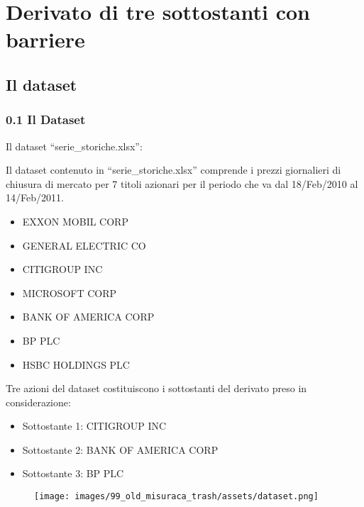 
\section[Derivato 1]{Derivato di tre sottostanti con barriere}


\subsection[Il dataset]{Il dataset}
\begin{frame}
	
	\frametitle{0.1 Il Dataset}
	
	\begin{block}{Il dataset ``serie\_storiche.xlsx'':}

		Il dataset contenuto in ``serie\_storiche.xlsx'' comprende i prezzi giornalieri di chiusura di mercato per 7 titoli azionari per il periodo che va dal 18/Feb/2010 al 14/Feb/2011.\\
		
		\begin{itemize}
			\item EXXON MOBIL CORP
			\item GENERAL ELECTRIC CO
			\item CITIGROUP INC
			\item MICROSOFT CORP
			\item BANK OF AMERICA CORP
			\item BP PLC	
			\item HSBC HOLDINGS PLC
		\end{itemize}

		
	\end{block}

\end{frame}


\begin{frame}
	
	\begin{block}{Tre azioni del dataset costituiscono i sottostanti del derivato preso in considerazione:}
		\begin{itemize}
			\item Sottostante 1: CITIGROUP INC
			\item Sottostante 2: BANK OF AMERICA CORP
			\item Sottostante 3: BP PLC
		\end{itemize}

	\end{block}
	
	\begin{figure}[!htbp]
		\centering
		\texttt{[image: images/99\_old\_misuraca\_trash/assets/dataset.png]}
	\end{figure}
\end{frame}



